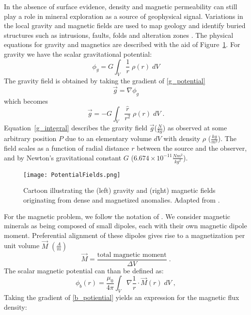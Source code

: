 In the absence of surface evidence, density and magnetic permeability can still play a role in mineral exploration as a source of geophysical signal. Variations in the local gravity and magnetic fields are used to map geology and identify buried structures such as intrusions, faults, folds and alteration zones \cite[]{Domzalski1966, Grant1984}. 
The physical equations for gravity and magnetics are described with the aid of Figure~\ref{PotentialFields}. For gravity we have the scalar gravitational potential:
\begin{equation}\label{g_potential}
\phi_g = G \int_V \frac{1}{r}\; \rho(r)\; dV
\end{equation}
The gravity field is obtained by taking the gradient of \eqref{g_potential}
\begin{equation}
\vec{g} = \nabla \phi_g
\end{equation}
which becomes
\begin{equation}\label{g_integral}
\vec{g} = - G \int_V \frac{\hat{r}}{r^2}\; \rho(r)\; dV\;.
\end{equation}
Equation~\eqref{g_integral} describes the gravity field $\vec{g}$($\frac{N}{kg}$) as observed at some arbitrary position $P$ due to an elementary volume $dV$ with density $\rho$ ($\frac{kg}{m^3}$). The field scales as a function of radial distance $r$ between the source and the observer, and by Newton's gravitational constant $G$ ($6.674\times10^{−11} \frac{N m^2}{ kg^2}$). 
\begin{figure}[h!]
\texttt{[image: PotentialFields.png]}
\caption{Cartoon illustrating the (left) gravity and (right) magnetic fields originating from dense and magnetized anomalies. Adapted from \cite[]{Blakely96}.}
\label{PotentialFields}
\end{figure}
For the magnetic problem, we follow the notation of \cite{Blakely96}.
We consider magnetic minerals as being composed of small dipoles, each with their own magnetic dipole moment. Preferential alignment of these dipoles gives rise to a magnetization per unit volume $\vec{M}$ $\left( \frac{A}{m} \right)$
\begin{equation}
\vec M = \frac{\text{total magnetic moment}}{\Delta V}\;.
\end{equation}
The scalar magnetic potential can than be defined as:
\begin{equation} \label{b_potiential}
\phi_b(r) = \frac{\mu_0}{4\pi} \int_{V} \nabla \frac{1}{r} \cdot \vec{M}(r) \;dV\;,
\end{equation}
Taking the gradient of \eqref{b_potiential} yields an expression for the magnetic flux density:
